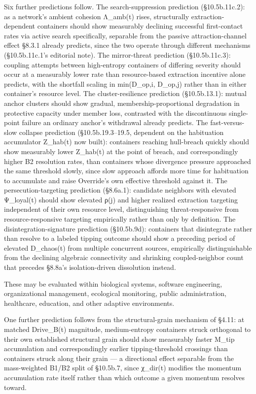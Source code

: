 \documentclass[
]{article}
\begin{document}
Six further predictions follow. The search-suppression prediction
(§10.5b.11c.2): as a network's ambient cohesion Λ\_amb(t) rises,
structurally extraction-dependent containers should show measurably
declining successful first-contact rates via active search specifically,
separable from the passive attraction-channel effect §8.3.1 already
predicts, since the two operate through different mechanisms
(§10.5b.11c.1's editorial note). The mirror-threat prediction
(§10.5b.11c.3): coupling attempts between high-entropy containers of
differing severity should occur at a measurably lower rate than
resource-based extraction incentive alone predicts, with the shortfall
scaling in min(D\_op,i, D\_op,j) rather than in either container's
resource level. The cluster-resilience prediction (§10.5b.13.1): mutual
anchor clusters should show gradual, membership-proportional degradation
in protective capacity under member loss, contrasted with the
discontinuous single-point failure an ordinary anchor's withdrawal
already predicts. The fast-versus-slow collapse prediction
(§10.5b.19.3--19.5, dependent on the habituation accumulator Z\_hab(t)
now built): containers reaching hull-breach quickly should show
measurably lower Z\_hab(t) at the point of breach, and correspondingly
higher B2 resolution rates, than containers whose divergence pressure
approached the same threshold slowly, since slow approach affords more
time for habituation to accumulate and raise Override's own effective
threshold against it. The persecution-targeting prediction (§8.6a.1):
candidate neighbors with elevated Ψ\_loyal(t) should show elevated ρ(j)
and higher realized extraction targeting independent of their own
resource level, distinguishing threat-responsive from
resource-responsive targeting empirically rather than only by
definition. The disintegration-signature prediction (§10.5b.9d):
containers that disintegrate rather than resolve to a labeled tipping
outcome should show a preceding period of elevated D\_chaos(t) from
multiple concurrent sources, empirically distinguishable from the
declining algebraic connectivity and shrinking coupled-neighbor count
that precedes §8.8a's isolation-driven dissolution instead.

These may be evaluated within biological systems, software engineering,
organizational management, ecological monitoring, public administration,
healthcare, education, and other adaptive environments.

One further prediction follows from the structural-grain mechanism of
§4.11: at matched Drive\_B(t) magnitude, medium-entropy containers
struck orthogonal to their own established structural grain should show
measurably faster M\_tip accumulation and correspondingly earlier
tipping-threshold crossings than containers struck along their grain ---
a directional effect separable from the mass-weighted B1/B2 split of
§10.5b.7, since χ\_dir(t) modifies the momentum accumulation rate itself
rather than which outcome a given momentum resolves toward.
\end{document}
